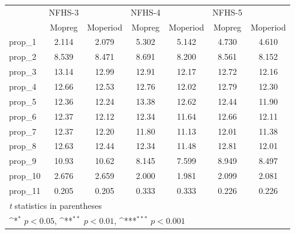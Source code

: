 {
\def\sym#1{\ifmmode^{#1}\else\(^{#1}\)\fi}
\begin{tabular}{l*{6}{c}}
\toprule
            &      NFHS-3         &                     &      NFHS-4         &                     &      NFHS-5         &                     \\
            &\multicolumn{1}{c}{Mopreg}&\multicolumn{1}{c}{Moperiod}&\multicolumn{1}{c}{Mopreg}&\multicolumn{1}{c}{Moperiod}&\multicolumn{1}{c}{Mopreg}&\multicolumn{1}{c}{Moperiod}\\
\midrule
\midrule
prop\_1      &       2.114         &       2.079         &       5.302         &       5.142         &       4.730         &       4.610         \\
prop\_2      &       8.539         &       8.471         &       8.691         &       8.200         &       8.561         &       8.152         \\
prop\_3      &       13.14         &       12.99         &       12.91         &       12.17         &       12.72         &       12.16         \\
prop\_4      &       12.66         &       12.53         &       12.76         &       12.02         &       12.79         &       12.30         \\
prop\_5      &       12.36         &       12.24         &       13.38         &       12.62         &       12.44         &       11.90         \\
prop\_6      &       12.37         &       12.12         &       12.34         &       11.64         &       12.66         &       12.11         \\
prop\_7      &       12.37         &       12.20         &       11.80         &       11.13         &       12.01         &       11.38         \\
prop\_8      &       12.63         &       12.44         &       12.34         &       11.48         &       12.81         &       12.01         \\
prop\_9      &       10.93         &       10.62         &       8.145         &       7.599         &       8.949         &       8.497         \\
prop\_10     &       2.676         &       2.659         &       2.000         &       1.981         &       2.099         &       2.081         \\
prop\_11     &       0.205         &       0.205         &       0.333         &       0.333         &       0.226         &       0.226         \\
\bottomrule
\multicolumn{7}{l}{\footnotesize \textit{t} statistics in parentheses}\\
\multicolumn{7}{l}{\footnotesize \sym{*} \(p<0.05\), \sym{**} \(p<0.01\), \sym{***} \(p<0.001\)}\\
\end{tabular}
}
